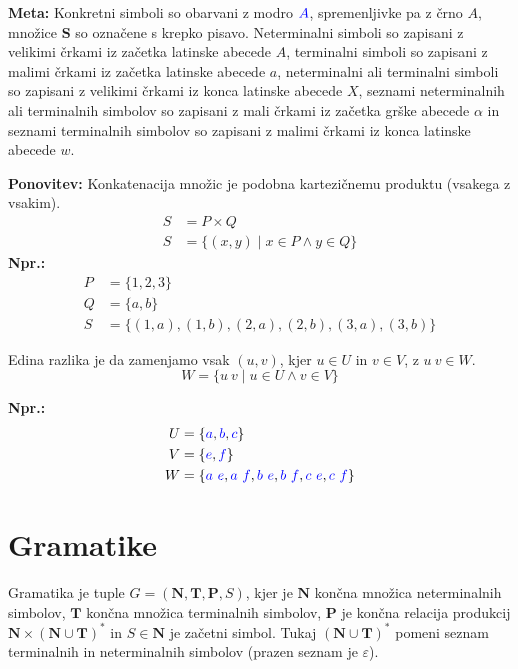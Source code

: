 \documentclass{article}
\newcommand{\Ex}{\textbf{Npr.:}\ }
\newcommand{\Special}[1]{\textbf{#1}}
\newcommand{\Set}[1]{\mathbf{#1}}
\newcommand{\Symbol}[1]{\textcolor{blue}{#1}}
\newcommand{\Grammar}{G}
\newcommand{\Terminals}{\Set{T}}
\newcommand{\NonTerminals}{\Set{N}}
\newcommand{\Productions}{\Set{P}}
\newcommand{\StartSymbol}{S}
\newcommand{\Null}{\varepsilon}
\newcommand{\Seq}{\ }
\newcommand{\Kleene}[1]{#1^\ast}
\begin{document}
\Special{Meta:} Konkretni simboli so obarvani z modro $\Symbol{A}$, spremenljivke pa z črno $A$, množice $\Set{S}$ so označene s krepko pisavo.
Neterminalni simboli so zapisani z velikimi črkami iz začetka latinske abecede $A$, terminalni simboli so zapisani z malimi črkami iz začetka latinske abecede $a$, neterminalni ali terminalni simboli so zapisani z velikimi črkami iz konca latinske abecede $X$, seznami neterminalnih ali terminalnih simbolov so zapisani z mali črkami iz začetka grške abecede $\alpha$ in seznami terminalnih simbolov so zapisani z malimi črkami iz konca latinske abecede $w$.

\Special{Ponovitev:}
Konkatenacija množic je podobna kartezičnemu produktu (vsakega z vsakim).
\begin{align*}
  S &= P \times Q \\
  S &= \{ (x, y) \mid x \in P \land y \in Q\}
\end{align*}
\Ex
\begin{align*}
  P &= \{1, 2, 3\}\\
  Q &= \{a, b\}\\
  S &= \{(1, a), (1, b), (2, a), (2, b), (3, a), (3, b) \}
\end{align*}

Edina razlika je da zamenjamo vsak $(u, v)$, kjer $u \in U$ in $v\in V$, z $u \Seq v \in W$.
\begin{equation*}
  W = \{ u \Seq v \mid u \in U \land v \in V\}
\end{equation*}

\Ex
\begin{align*}
  U &= \{\Symbol{a}, \Symbol{b}, \Symbol{c}\}\\
  V &= \{\Symbol{e}, \Symbol{f}\}\\
  W &= \{\Symbol{a} \Seq \Symbol{e}, \Symbol{a} \Seq \Symbol{f}, \Symbol{b} \Seq \Symbol{e}, \Symbol{b} \Seq \Symbol{f}, \Symbol{c} \Seq \Symbol{e}, \Symbol{c} \Seq \Symbol{f}\}
\end{align*}

\section{Gramatike}
Gramatika je tuple $\Grammar = (\NonTerminals, \Terminals, \Productions, \StartSymbol)$, kjer je $\NonTerminals$ končna množica neterminalnih simbolov, $\Terminals$ končna množica terminalnih simbolov, $\Productions$ je končna relacija produkcij $\NonTerminals \times \Kleene{(\NonTerminals \cup \Terminals)}$ in $\StartSymbol \in \NonTerminals$ je začetni simbol.
Tukaj $\Kleene{(\NonTerminals \cup \Terminals)}$ pomeni seznam terminalnih in neterminalnih simbolov (prazen seznam je $\Null$).
\end{document}
